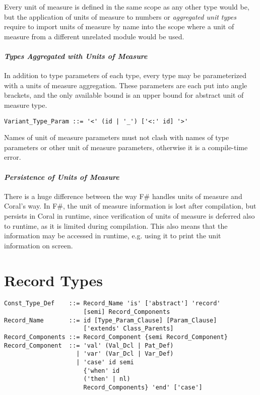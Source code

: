 Every unit of measure is defined in the same scope as any other type would be, but the application of units of measure to numbers or {\em aggregated unit types} require to import units of measure by name into the scope where a unit of measure from a different unrelated module would be used. 

\paragraph{\em Types Aggregated with Units of Measure}
In addition to type parameters of each type, every type may be parameterized with a units of measure aggregation. These parameters are each put into angle brackets, and the only available bound is an upper bound for abstract unit of measure type. 

\syntax\begin{lstlisting}[mathescape=false]
Variant_Type_Param ::= '<' (id | '_') ['<:' id] '>'
\end{lstlisting}

Names of unit of measure parameters must not clash with names of type parameters or other unit of measure parameters, otherwise it is a compile-time error. 

\paragraph{\em Persistence of Units of Measure}
There is a huge difference between the way F\# handles units of measure and Coral's way. In F\#, the unit of measure information is lost after compilation, but persists in Coral in runtime, since verification of units of measure is deferred also to runtime, as it is limited during compilation. This also means that the information may be accessed in runtime, e.g. using it to print the unit information on screen.






\section{Record Types}
\label{sec:record-types}

\syntax\begin{lstlisting}
Const_Type_Def    ::= Record_Name 'is' ['abstract'] 'record'
                      [semi] Record_Components
Record_Name       ::= id [Type_Param_Clause] [Param_Clause]
                      ['extends' Class_Parents]
Record_Components ::= Record_Component {semi Record_Component}
Record_Component  ::= 'val' (Val_Dcl | Pat_Def)
                    | 'var' (Var_Dcl | Var_Def)
                    | 'case' id semi 
                      {'when' id 
                      ('then' | nl) 
                      Record_Components} 'end' ['case']
\end{lstlisting}

